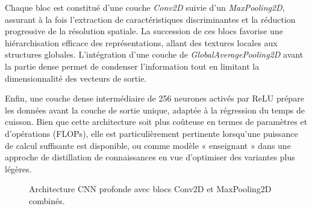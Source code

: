 Chaque bloc est constitué d’une couche \textit{Conv2D} suivie d’un \textit{MaxPooling2D}, assurant à la fois l’extraction de caractéristiques discriminantes et la réduction progressive de la résolution spatiale. La succession de ces blocs favorise une hiérarchisation efficace des représentations, allant des textures locales aux structures globales. L’intégration d’une couche de \textit{GlobalAveragePooling2D} avant la partie dense permet de condenser l’information tout en limitant la dimensionnalité des vecteurs de sortie.  

Enfin, une couche dense intermédiaire de 256 neurones activés par ReLU prépare les données avant la couche de sortie unique, adaptée à la régression du temps de cuisson. Bien que cette architecture soit plus coûteuse en termes de paramètres et d’opérations (FLOPs), elle est particulièrement pertinente lorsqu’une puissance de calcul suffisante est disponible, ou comme modèle « enseignant » dans une approche de distillation de connaissances en vue d’optimiser des variantes plus légères.  


\begin{figure}[H]
    \centering
    \small
    \caption{Architecture CNN profonde avec blocs Conv2D et MaxPooling2D combinés.}
    \label{fig:cnn2_tbnet5_combined}
\end{figure}




